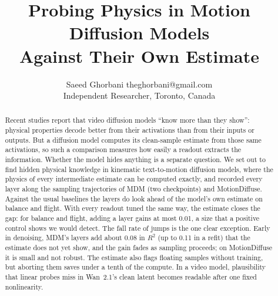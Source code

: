 \documentclass[10pt]{article}
\title{Probing Physics in Motion Diffusion Models\\Against Their Own Estimate}
\author{\name Saeed Ghorbani \email theghorbani@gmail.com \\
        \addr Independent Researcher, Toronto, Canada}
\theoremstyle{remark}
\begin{document}
\maketitle

\begin{abstract}
Recent studies report that video diffusion models ``know more than they show'': physical properties decode better from their activations than from their inputs or outputs. But a diffusion model computes its clean-sample estimate from those same activations, so such a comparison measures how easily a readout extracts the information. Whether the model hides anything is a separate question. We set out to find hidden physical knowledge in kinematic text-to-motion diffusion models, where the physics of every intermediate estimate can be computed exactly, and recorded every layer along the sampling trajectories of MDM (two checkpoints) and MotionDiffuse. Against the usual baselines the layers do look ahead of the model's own estimate on balance and flight. With every readout tuned the same way, the estimate closes the gap: for balance and flight, adding a layer gains at most 0.01, a size that a positive control shows we would detect. The fall rate of jumps is the one clear exception. Early in denoising, MDM's layers add about 0.08 in $R^2$ (up to 0.11 in a refit) that the estimate does not yet show, and the gain fades as sampling proceeds; on MotionDiffuse it is small and not robust. The estimate also flags floating samples without training, but aborting them saves under a tenth of the compute. In a video model, plausibility that linear probes miss in Wan~2.1's clean latent becomes readable after one fixed nonlinearity.
\end{abstract}










\appendix

\end{document}
